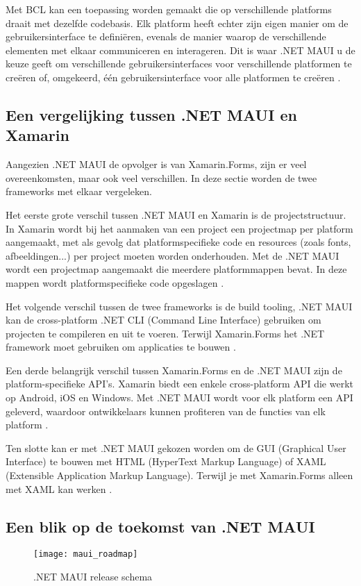 Met BCL kan een toepassing worden gemaakt die op verschillende platforms draait met dezelfde codebasis. Elk platform heeft echter zijn eigen manier om de gebruikersinterface te definiëren, evenals de manier waarop de verschillende elementen met elkaar communiceren en interageren. Dit is waar .NET MAUI u de keuze geeft om verschillende gebruikersinterfaces voor verschillende platformen te creëren of, omgekeerd, één gebruikersinterface voor alle platformen te creëren \autocite{Britch2023}.

\subsection{Een vergelijking tussen .NET MAUI en Xamarin}
Aangezien .NET MAUI de opvolger is van Xamarin.Forms, zijn er veel overeenkomsten, maar ook veel verschillen. In deze sectie worden de twee frameworks met elkaar vergeleken.

Het eerste grote verschil tussen .NET MAUI en Xamarin is de projectstructuur. In Xamarin wordt bij het aanmaken van een project een projectmap per platform aangemaakt, met als gevolg dat platformspecifieke code en resources (zoals fonts, afbeeldingen...) per project moeten worden onderhouden. Met de .NET MAUI wordt een projectmap aangemaakt die meerdere platformmappen bevat. In deze mappen wordt platformspecifieke code opgeslagen \autocite{Koleva2023}.

Het volgende verschil tussen de twee frameworks is de build tooling, .NET MAUI kan de cross-platform .NET CLI (Command Line Interface) gebruiken om projecten te compileren en uit te voeren. Terwijl Xamarin.Forms het .NET framework moet gebruiken om applicaties te bouwen \autocite{Kathiresan2022}.

Een derde belangrijk verschil tussen Xamarin.Forms en de .NET MAUI zijn de platform-specifieke API's. Xamarin biedt een enkele cross-platform API die werkt op Android, iOS en Windows. Met .NET MAUI wordt voor elk platform een API geleverd, waardoor ontwikkelaars kunnen profiteren van de functies van elk platform \autocite{UXDivers}.

Ten slotte kan er met .NET MAUI gekozen worden om de GUI (Graphical User Interface) te bouwen met HTML (HyperText Markup Language) of XAML (Extensible Application Markup Language). Terwijl je met Xamarin.Forms alleen met XAML kan werken \autocite{Kathiresan2022}.

\subsection{Een blik op de toekomst van .NET MAUI}
\begin{figure}[H]
    \texttt{[image: maui\_roadmap]}
    \centering
    \caption[.NET MAUI release schema]{.NET MAUI release schema \autocite{Ramel2022}}
    \label{fig:mauiRoadMap}
\end{figure}

